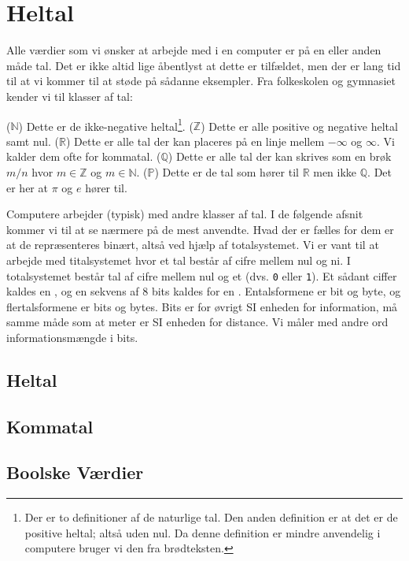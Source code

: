 \chapter{Heltal}
\label{sec:int}

Alle værdier som vi ønsker at arbejde med i en computer er på en eller anden måde tal. Det er ikke altid lige åbentlyst at dette er tilfældet, men der er lang tid til at vi kommer til at støde på sådanne eksempler. Fra folkeskolen og gymnasiet kender vi til klasser af tal:
\begin{itemize}
   ($\mathbb{N}$) Dette er de ikke-negative heltal\footnote{Der er to definitioner af de naturlige tal. Den anden definition er at det er de positive heltal; altså uden nul. Da denne definition er mindre anvendelig i computere bruger vi den fra brødteksten.}.
   ($\mathbb{Z}$) Dette er alle positive og negative heltal samt nul.
   ($\mathbb{R}$) Dette er alle tal der kan placeres på en linje mellem $-\infty$ og $\infty$. Vi kalder dem ofte for kommatal.
   ($\mathbb{Q}$) Dette er alle tal der kan skrives som en brøk $m/n$ hvor $m \in \mathbb{Z}$ og $m \in \mathbb{N}$.
   ($\mathbb{P}$) Dette er de tal som hører til $\mathbb{R}$ men ikke $\mathbb{Q}$. Det er her at $\pi$ og $e$ hører til.
\end{itemize}
Computere arbejder (typisk) med andre klasser af tal. I de følgende afsnit kommer vi til at se nærmere på de mest anvendte. Hvad der er fælles for dem er at de repræsenteres binært, altså ved hjælp af totalsystemet. Vi er vant til at arbejde med titalsystemet hvor et tal består af cifre mellem nul og ni. I totalsystemet består tal af cifre mellem nul og et (dvs. \texttt{0} eller \texttt{1}). Et sådant ciffer kaldes en , og en sekvens af 8 bits kaldes for en . Entalsformene er bit og byte, og flertalsformene er bits og bytes. Bits er for øvrigt SI enheden for information, må samme måde som at meter er SI enheden for distance. Vi måler med andre ord informationsmængde i bits.

\section{Heltal}



\section{Kommatal}


\section{Boolske Værdier}

